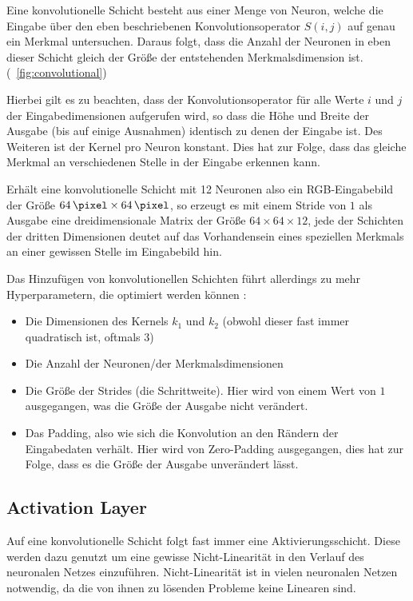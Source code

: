 Eine konvolutionelle Schicht besteht aus einer Menge von Neuron, welche die Eingabe über den eben beschriebenen Konvolutionsoperator $S(i,j)$ auf genau ein Merkmal untersuchen. Daraus folgt, dass die Anzahl der Neuronen in eben dieser Schicht gleich der Größe der entstehenden Merkmalsdimension ist. (\vgl \figurename~\ref{fig:convolutional})

Hierbei gilt es zu beachten, dass der Konvolutionsoperator für alle Werte $i$ und $j$ der Eingabedimensionen aufgerufen wird, so dass die Höhe und Breite der Ausgabe (bis auf einige Ausnahmen) identisch zu denen der Eingabe ist.
Des Weiteren ist der Kernel pro Neuron konstant. Dies hat \ua zur Folge, dass das gleiche Merkmal an verschiedenen Stelle in der Eingabe erkennen kann.

Erhält eine konvolutionelle Schicht mit 12 Neuronen also \bspw ein RGB-Eingabebild der Größe $\SI{64}{\pixel}\times\SI{64}{\pixel}$, so erzeugt es mit einem Stride von $1$ als Ausgabe eine dreidimensionale Matrix der Größe $64\times64\times12$, jede der Schichten der dritten Dimensionen deutet auf das Vorhandensein eines speziellen Merkmals an einer gewissen Stelle im Eingabebild hin.

Das Hinzufügen von konvolutionellen Schichten führt allerdings zu mehr Hyperparametern, die optimiert werden können \cite{cs231n}:
\begin{itemize}
	\item Die Dimensionen des Kernels $k_1$ und $k_2$ (obwohl dieser fast immer quadratisch ist, oftmals $3$)
	\item Die Anzahl der Neuronen/der Merkmalsdimensionen
	\item Die Größe der Strides (die Schrittweite). Hier wird von einem Wert von $1$ ausgegangen, was die Größe der Ausgabe nicht verändert.
	\item Das Padding, also wie sich die Konvolution an den Rändern der Eingabedaten verhält. Hier wird von Zero-Padding ausgegangen, dies hat zur Folge, dass es die Größe der Ausgabe unverändert lässt.
\end{itemize}

\subsection{Activation Layer}
\label{ssec:activation}

Auf eine konvolutionelle Schicht folgt fast immer eine Aktivierungsschicht. Diese werden dazu genutzt um eine gewisse Nicht-Linearität in den Verlauf des neuronalen Netzes einzuführen. Nicht-Linearität ist in vielen neuronalen Netzen notwendig, da die von ihnen zu lösenden Probleme keine Linearen sind. \cite[Kap.~6]{deeplearning_16}

